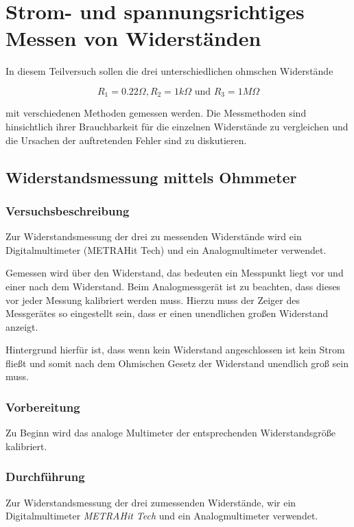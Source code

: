 \chapter[Widerstandsmessung]{Strom- und spannungsrichtiges Messen von Widerständen}

In diesem Teilversuch sollen die drei unterschiedlichen ohmschen Widerstände

\[
R_1 = 0.22 \Omega, R_2 = 1k \Omega \text{ und } R_3 = 1M \Omega
\]

mit verschiedenen Methoden gemessen werden. Die Messmethoden sind hinsichtlich ihrer Brauchbarkeit für die einzelnen Widerstände zu vergleichen und die Ursachen der auftretenden Fehler sind zu diskutieren.

\section[Ohmmeter]{Widerstandsmessung mittels Ohmmeter}
\subsection{Versuchsbeschreibung}

Zur Widerstandsmessung der drei zu messenden Widerstände wird ein Digitalmultimeter (METRAHit Tech) und ein Analogmultimeter verwendet.

Gemessen wird über den Widerstand, das bedeuten ein Messpunkt liegt vor und einer nach dem Widerstand. Beim Analogmessgerät ist zu beachten, dass dieses vor jeder Messung kalibriert werden muss. Hierzu muss der Zeiger des Messgerätes so eingestellt sein, dass er einen unendlichen großen Widerstand anzeigt.

Hintergrund hierfür ist, dass wenn kein Widerstand angeschlossen ist kein Strom fließt und somit nach dem Ohmischen Gesetz der Widerstand unendlich groß sein muss.

\subsection{Vorbereitung}

Zu Beginn wird das analoge Multimeter der entsprechenden Widerstandsgröße kalibriert.

\subsection{Durchführung}
Zur Widerstandsmessung der drei zumessenden Widerstände, wir ein Digitalmultimeter \textit{METRAHit Tech} und ein Analogmultimeter verwendet.

